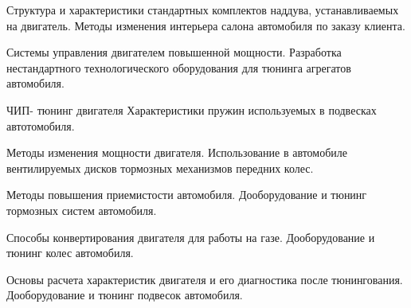 \documentclass[
	14pt,
	a4paper,
	]
	{scrartcl}
\begin{document}
\vfill

\newpage


\shapk
{}
\setcounter{zad}{0}

\vfill
\z Структура и характеристики стандартных комплектов наддува, устанавливаемых на двигатель.
 \vfill
\z Методы изменения интерьера салона автомобиля по заказу клиента.
 \vfill

\vfill

\newpage


\shapk
{}
\setcounter{zad}{0}

\vfill
\z Системы управления двигателем повышенной мощности.
 \vfill
\z Разработка нестандартного технологического оборудования для тюнинга агрегатов автомобиля.
 \vfill

\vfill

\newpage


\shapk
{}
\setcounter{zad}{0}

\vfill
\z ЧИП- тюнинг двигателя
 \vfill
\z Характеристики пружин используемых в подвесках автотомобиля.
 \vfill

\vfill

\newpage


\shapk
{}
\setcounter{zad}{0}

\vfill
\z Методы изменения мощности двигателя.
 \vfill
\z Использование в автомобиле вентилируемых дисков тормозных механизмов передних колес.
 \vfill

\vfill

\newpage


\shapk
{}
\setcounter{zad}{0}

\vfill
\z Методы повышения приемистости автомобиля.
 \vfill
\z Дооборудование и тюнинг тормозных систем автомобиля.
 \vfill

\vfill

\newpage


\shapk
{}
\setcounter{zad}{0}

\vfill
\z Способы конвертирования двигателя для работы на газе.
 \vfill
\z Дооборудование и тюнинг колес автомобиля.
 \vfill

\vfill

\newpage


\shapk
{}
\setcounter{zad}{0}

\vfill
\z Основы расчета характеристик двигателя и его диагностика после тюнингования.
 \vfill
\z Дооборудование и тюнинг подвесок автомобиля.
 \vfill
\end{document}
